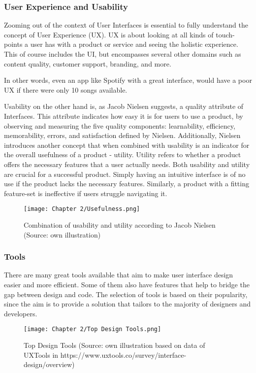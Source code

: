 \subsubsection{User Experience and Usability}
Zooming out of the context of User Interfaces is essential to fully understand the concept of User
Experience (UX). UX is about looking at all kinds of touch-points a user has with a product or
service and seeing the holistic experience. This of course includes the UI, but encompasses several
other domains such as content quality, customer support, branding, and more.

In other words, even an app like Spotify with a great interface, would have a poor UX if there were
only 10 songs available.

Usability on the other hand is, as Jacob Nielsen suggests, a quality attribute of Interfaces. This
attribute indicates how easy it is for users to use a product, by observing and measuring the five
quality components: learnability, efficiency, memorability, errors, and satisfaction
defined by Nielsen. Additionally, Nielsen introduces another concept that when combined with
usability is an indicator for the overall usefulness of a product - utility. Utility refers to
whether a product offers the necessary features that a user actually needs. Both usability and
utility are crucial for a successful product. Simply having an intuitive interface is of no use if
the product lacks the necessary features. Similarly, a product with a fitting feature-set is
ineffective if users struggle navigating it.
\begin{figure}[H]
    \centering
    \texttt{[image: Chapter 2/Usefulness.png]}
    \caption{Combination of usability and utility according to Jacob Nielsen (Source: own illustration)}
\end{figure}

\subsubsection{Tools}
There are many great tools available that aim to make user interface design easier and more
efficient. Some of them also have features that help to bridge the gap between design and code. The
selection of tools is based on their popularity, since the aim is to provide a solution that
tailors to the majority of designers and developers. %
\begin{figure}[H]
    \centering
    \texttt{[image: Chapter 2/Top Design Tools.png]}
    \caption{Top Design Tools (Source: own illustration based on data of UXTools in https://www.uxtools.co/survey/interface-design/overview)}
\end{figure}

